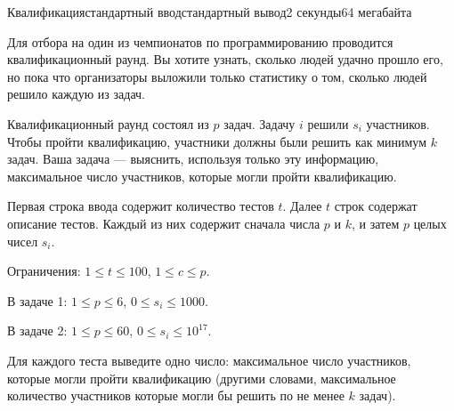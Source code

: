 \begin{problem}{Квалификация}{стандартный ввод}{стандартный вывод}{2 секунды}{64 мегабайта}

Для отбора на один из чемпионатов по программированию проводится квалификационный раунд. Вы хотите узнать, сколько людей удачно прошло его, но пока что организаторы выложили только статистику о том, сколько людей решило каждую из задач.

Квалификационный раунд состоял из $p$ задач. Задачу $i$ решили $s_i$ участников. Чтобы пройти квалификацию, участники должны были решить как минимум $k$ задач. Ваша задача --- выяснить, используя только эту информацию, максимальное число участников, которые могли пройти квалификацию.


\InputFile
Первая строка ввода содержит количество тестов $t$. Далее $t$ строк содержат описание тестов. Каждый из них содержит сначала числа $p$ и $k$, и затем $p$ целых чисел $s_i$.

Ограничения: $1\le t\le 100$, $1\le c\le p$.

В задаче 1: $1\le p\le 6$, $0\le s_i\le 1000$.

В задаче 2: $1\le p\le 60$, $0\le s_i\le 10^{17}$.


\OutputFile
Для каждого теста выведите одно число: максимальное число участников, которые могли пройти квалификацию (другими словами, максимальное количество участников которые могли бы решить по не менее $k$ задач).


\Examples

\begin{example}
%
\end{example}

\end{problem}
